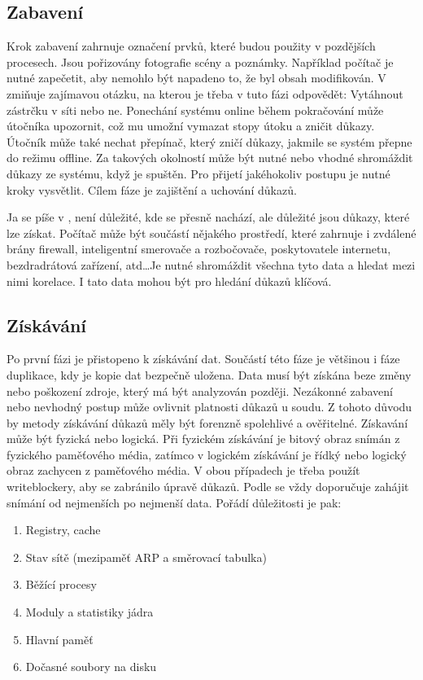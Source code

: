 \documentclass[thesis=B,czech]{FITthesis}[2012/06/26]
\begin{document}
\subsection{Zabavení}
Krok zabavení zahrnuje označení prvků, které budou použity v pozdějších procesech. Jsou pořizovány fotografie scény a poznámky. Například počítač je nutné zapečetit, aby nemohlo být napadeno to, že byl obsah modifikován. V \cite{for_sez} zmiňuje zajímavou otázku, na kterou je třeba v tuto fázi odpovědět: Vytáhnout zástrčku v síti nebo ne. Ponechání systému online během pokračování může útočníka upozornit, což mu umožní vymazat stopy útoku a zničit důkazy. Útočník může také nechat přepínač, který zničí důkazy, jakmile se systém přepne do režimu offline. Za takových okolností může být nutné nebo vhodné shromáždit důkazy ze systému, když je spuštěn. Pro přijetí jakéhokoliv postupu je nutné kroky vysvětlit. Cílem fáze je zajištění a uchování důkazů.

Ja se píše v \cite{palmer2002forensic}, není důležité, kde se přesně nachází, ale důležité jsou důkazy, které lze získat. Počítač může být součástí nějakého prostředí, které zahrnuje i zvdálené brány firewall, inteligentní smerovače a rozbočovače, poskytovatele internetu, bezdradrátová zařízení, atd\dots Je nutné shromáždit všechna tyto data a hledat mezi nimi korelace. I tato data mohou být pro hledání důkazů klíčová.

\subsection{Získávání}
Po první fázi je přistopeno k získávání dat. Součástí této fáze je většinou i fáze duplikace, kdy je kopie dat bezpečně uložena. Data musí být získána beze změny nebo poškození zdroje, který má být analyzován později. Nezákonné zabavení nebo nevhodný postup může ovlivnit platnosti důkazů u soudu. Z tohoto důvodu by metody získávání důkazů měly být forenzně spolehlivé a ověřitelné. Získavání může být fyzická nebo logická. Při fyzickém získávání je bitový obraz snímán z fyzického paměťového média, zatímco v logickém získávání je řídký nebo logický obraz zachycen z paměťového média. V obou případech je třeba použít writeblockery, aby se zabránilo úpravě důkazů. Podle \cite{for_sez} se vždy doporučuje zahájit snímání od nejmenších po nejmenší data. Pořádí důležitosti je pak: 

\begin{enumerate}
\item Registry, cache
\item Stav sítě (mezipaměť ARP a směrovací tabulka)
\item Běžící procesy
\item Moduly a statistiky jádra
\item Hlavní paměť
\item Dočasné soubory na disku
\end{enumerate}
\end{document}
